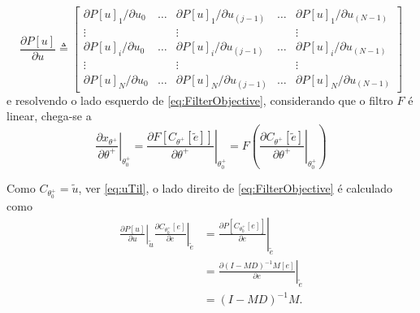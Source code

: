 \begin{equation}
   \frac{\partial P[u]}{\partial u} \triangleq 
   \begin{bmatrix} 
      \partial P[u]_1/\partial u_0 & \dots & \partial P[u]_1/\partial u_{(j-1)} & \dots & \partial P[u]_1/\partial u_{(N-1)} \\
      \vdots &  & \vdots & & \vdots \\ 
      \partial P[u]_i/\partial u_0 & \dots & \partial P[u]_i/\partial u_{(j-1)} & \dots & \partial P[u]_i/\partial u_{(N-1)} \\
      \vdots & & \vdots & & \vdots \\ 
      \partial P[u]_N/\partial u_0 & \dots & \partial P[u]_N/\partial u_{(j-1)} & \dots & \partial P[u]_N/\partial u_{(N-1)}
   \end{bmatrix}  
   \label{eq:PuDu}
\end{equation}
e resolvendo o lado esquerdo de \eqref{eq:FilterObjective}, considerando que o filtro $F$ é linear, chega-se a
\begin{equation}
   \left.\frac{\partial x_{\theta^{+}}}{\partial \theta^{+}}\right|_{\theta_{0}^{+}}=\left.\frac{\partial F\left[C_{\theta^{+}}[\tilde{e}]\right]}{\partial \theta^{+}}\right|_{\theta_{0}^{+}}=F\left(\left.\frac{\partial C_{\theta^{+}}[\tilde{e}]}{\partial \theta^{+}}\right|_{\theta_{0}^{+}}\right)
\label{eq:28}
\end{equation}

Como $C_{\theta_0^+} = \tilde{u}$, ver \eqref{eq:uTil}, o lado direito de \eqref{eq:FilterObjective} é calculado como
\begin{align}
\left.\left.\frac{\partial P[u]}{\partial u}\right|_{\tilde{u}} \frac{\partial C_{\theta_{0}^{+}}[e]}{\partial e}\right|_{\tilde{e}} &=\left.\frac{\partial P\left[C_{\theta_{0}^{+}}[e]\right]}{\partial e}\right|_{\tilde{e}} \nonumber\\
&=\left.\frac{\partial(I-M D)^{-1} M[e]}{\partial e}\right|_{\tilde{e}} \nonumber\\
&=(I-M D)^{-1} M .
\label{eq:29}
\end{align}

